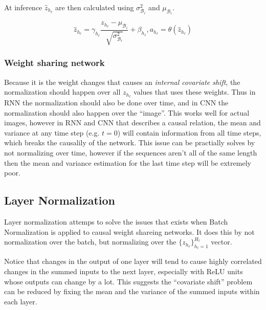 At inference $\hat{z}_{h_\ell}$ are then calculated using $\sigma^2_{\mathcal{B}_i}$ and $\mu_{\mathcal{B}_i}$.

\begin{equation}
\hat{z}_{h_\ell} = \gamma_{h_\ell} \frac{z_{h_\ell} - \mu_{\mathcal{B}_i}}{\sqrt{\sigma^2_{\mathcal{B}_i}}} + \beta_{h_\ell}, a_{h_\ell} = \theta(\hat{z}_{h_\ell})
\end{equation}

\subsubsection{Weight sharing network}

Because it is the weight changes that causes an \textit{internal covariate shift}, the normalization should happen over all $z_{h_\ell}$ values that uses these weights. Thus in RNN the normalization should also be done over time, and in CNN the normalization should also happen over the ``image''. This works well for actual images, however in RNN and CNN that describes a causal relation, the mean and variance at any time step (e.g. $t=0$) will contain information from all time steps, which breaks the causalily of the network. This issue can be practially solves by not normalizing over time, however if the sequences aren't all of the same length then the mean and variance estimation for the last time step will be extremely poor.

\subsection{Layer Normalization}

Layer normalization attemps to solve the issues that exists when Batch Normalization is applied to causal weight shareing networks. It does this by not normalization over the batch, but normalizing over the $\{z_{h_\ell}\}_{h_\ell=1}^{H_\ell}$ vector. \cite{layer-normalization}

\begin{displayquote}
Notice that changes in the output of one layer will tend to cause highly correlated changes in the summed inputs to the next layer, especially with ReLU units whose outputs can change by a lot. This suggests the “covariate shift” problem can be reduced by fixing the mean and the variance of the summed inputs within each layer. 
\end{displayquote}

